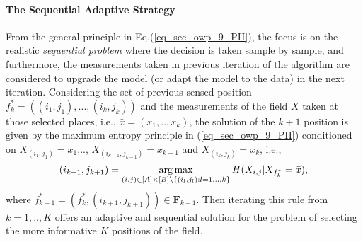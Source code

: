 \paragraph{The Sequential Adaptive Strategy} 

From the general principle in Eq.(\ref{eq_sec_owp_9_PII}), the focus is on the realistic {\em sequential problem} where the decision is taken sample by sample, and furthermore, the measurements taken in previous iteration of the algorithm are considered to upgrade the model (or adapt the model 
to the data) in the next iteration.  Considering the set of previous sensed position $f^*_k=((i_1,j_1),...,(i_k,j_k))$ and the measurements of the field $X$ taken at those selected places, i.e., $\bar{x}=(x_1,..,x_k)$, the solution of the $k+1$ position is given by the maximum entropy principle in (\ref{eq_sec_owp_9_PII}) conditioned on $X_{(i_1,j_1)}=x_1$,.., $X_{(i_{k-1},j_{k-1})}=x_{k-1}$ and $X_{(i_k,j_k)}=x_k$, i.e., 
\begin{align}\label{eq_adaptive_1_PII}
(i_{k+1},j_{k+1}) = 
\operatorname*{arg\,max}_{(i,j)\in [A]\times [B] \setminus \left\{(i_l,j_l): l=1,..,k\right\}} H(X_{i,j}|X_{f^*_k}=\bar{x}), 
\end{align}
where $f^*_{k+1}=(f^*_k,(i_{k+1},j_{k+1}))\in \mathbf{F}_{k+1}$.
Then iterating this rule from $k=1,..,K$ offers an adaptive and sequential solution 
for the problem of selecting the more informative $K$ positions of the field.


